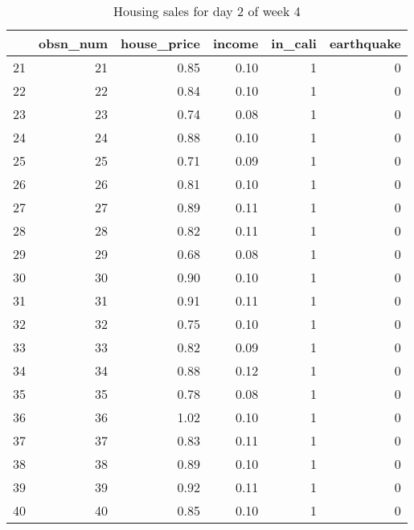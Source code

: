 \begin{table}[ht]
\centering
\begin{tabular}{rrrrrr}
  \hline
 & obsn\_num & house\_price & income & in\_cali & earthquake \\ 
  \hline
21 &  21 & 0.85 & 0.10 &   1 &   0 \\ 
  22 &  22 & 0.84 & 0.10 &   1 &   0 \\ 
  23 &  23 & 0.74 & 0.08 &   1 &   0 \\ 
  24 &  24 & 0.88 & 0.10 &   1 &   0 \\ 
  25 &  25 & 0.71 & 0.09 &   1 &   0 \\ 
  26 &  26 & 0.81 & 0.10 &   1 &   0 \\ 
  27 &  27 & 0.89 & 0.11 &   1 &   0 \\ 
  28 &  28 & 0.82 & 0.11 &   1 &   0 \\ 
  29 &  29 & 0.68 & 0.08 &   1 &   0 \\ 
  30 &  30 & 0.90 & 0.10 &   1 &   0 \\ 
  31 &  31 & 0.91 & 0.11 &   1 &   0 \\ 
  32 &  32 & 0.75 & 0.10 &   1 &   0 \\ 
  33 &  33 & 0.82 & 0.09 &   1 &   0 \\ 
  34 &  34 & 0.88 & 0.12 &   1 &   0 \\ 
  35 &  35 & 0.78 & 0.08 &   1 &   0 \\ 
  36 &  36 & 1.02 & 0.10 &   1 &   0 \\ 
  37 &  37 & 0.83 & 0.11 &   1 &   0 \\ 
  38 &  38 & 0.89 & 0.10 &   1 &   0 \\ 
  39 &  39 & 0.92 & 0.11 &   1 &   0 \\ 
  40 &  40 & 0.85 & 0.10 &   1 &   0 \\ 
   \hline
\end{tabular}
\caption{Housing sales for day 2 of week 4} 
\end{table}
